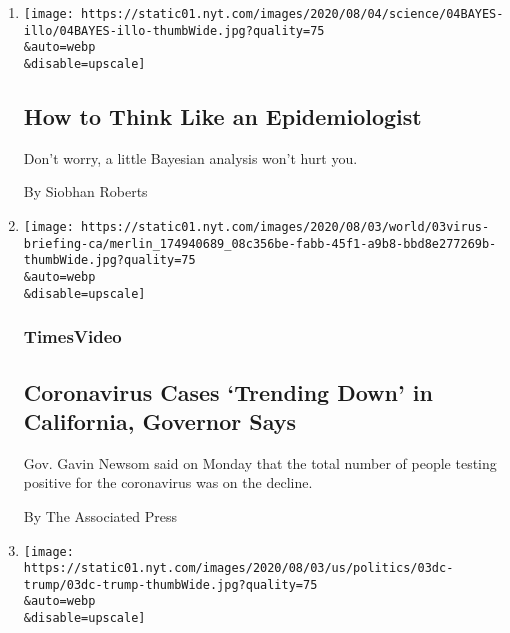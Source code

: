 \begin{enumerate}
\def\labelenumi{\arabic{enumi}.}
\item
  \href{/2020/08/04/science/coronavirus-bayes-statistics-math.html}{}

  \texttt{[image: https://static01.nyt.com/images/2020/08/04/science/04BAYES-illo/04BAYES-illo-thumbWide.jpg?quality=75\\\&auto=webp\\\&disable=upscale]}

  \hypertarget{how-to-think-like-an-epidemiologist}{%
  \subsection{How to Think Like an
  Epidemiologist}\label{how-to-think-like-an-epidemiologist}}

  Don't worry, a little Bayesian analysis won't hurt you.

  By Siobhan Roberts
\item
  \href{/video/us/100000007271181/california-virus-cases-trend-down.html}{}

  \texttt{[image: https://static01.nyt.com/images/2020/08/03/world/03virus-briefing-ca/merlin\_174940689\_08c356be-fabb-45f1-a9b8-bbd8e277269b-thumbWide.jpg?quality=75\\\&auto=webp\\\&disable=upscale]}

  \hypertarget{timesvideo}{%
  \subsubsection{TimesVideo}\label{timesvideo}}

  \hypertarget{coronavirus-cases-trending-down-in-california-governor-says}{%
  \subsection{Coronavirus Cases `Trending Down' in California, Governor
  Says}\label{coronavirus-cases-trending-down-in-california-governor-says}}

  Gov. Gavin Newsom said on Monday that the total number of people
  testing positive for the coronavirus was on the decline.

  By The Associated Press
\item
  \href{/2020/08/03/us/politics/trump-mail-in-voting.html}{}

  \texttt{[image: https://static01.nyt.com/images/2020/08/03/us/politics/03dc-trump/03dc-trump-thumbWide.jpg?quality=75\\\&auto=webp\\\&disable=upscale]}

  \hypertarget{trump-again-assails-mail-in-voting}{%
}
\end{enumerate}
